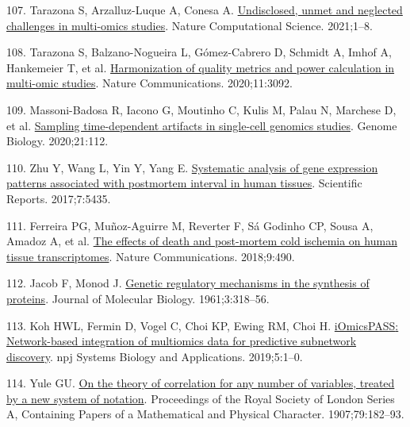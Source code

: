 \documentclass[
  12pt,
  a4paper,
  twoside,
  openright]{book}
\newlength{\cslhangindent}
\newlength{\cslentryspacingunit} %
\newenvironment{CSLReferences}[2] %
 {%
  \setlength{\parindent}{0pt}
  \ifodd #1
  \let\oldpar\par
  \def\par{\hangindent=\cslhangindent\oldpar}
  \fi
  \setlength{\parskip}{#2\cslentryspacingunit}
 }%
 {}
\begin{document}
\begin{CSLReferences}{0}{0}
\leavevmode{}%
107. Tarazona S, Arzalluz-Luque A, Conesa A. \href{https://doi.org/10.1038/s43588-021-00086-z}{Undisclosed, unmet and neglected challenges in multi-omics studies}. Nature Computational Science. 2021;1--8.

\leavevmode{}%
108. Tarazona S, Balzano-Nogueira L, Gómez-Cabrero D, Schmidt A, Imhof A, Hankemeier T, et al. \href{https://doi.org/10.1038/s41467-020-16937-8}{Harmonization of quality metrics and power calculation in multi-omic studies}. Nature Communications. 2020;11:3092.

\leavevmode{}%
109. Massoni-Badosa R, Iacono G, Moutinho C, Kulis M, Palau N, Marchese D, et al. \href{https://doi.org/10.1186/s13059-020-02032-0}{Sampling time-dependent artifacts in single-cell genomics studies}. Genome Biology. 2020;21:112.

\leavevmode{}%
110. Zhu Y, Wang L, Yin Y, Yang E. \href{https://doi.org/10.1038/s41598-017-05882-0}{Systematic analysis of gene expression patterns associated with postmortem interval in human tissues}. Scientific Reports. 2017;7:5435.

\leavevmode{}%
111. Ferreira PG, Muñoz-Aguirre M, Reverter F, Sá Godinho CP, Sousa A, Amadoz A, et al. \href{https://doi.org/10.1038/s41467-017-02772-x}{The effects of death and post-mortem cold ischemia on human tissue transcriptomes}. Nature Communications. 2018;9:490.

\leavevmode{}%
112. Jacob F, Monod J. \href{https://doi.org/10.1016/S0022-2836(61)80072-7}{Genetic regulatory mechanisms in the synthesis of proteins}. Journal of Molecular Biology. 1961;3:318--56.

\leavevmode{}%
113. Koh HWL, Fermin D, Vogel C, Choi KP, Ewing RM, Choi H. \href{https://doi.org/10.1038/s41540-019-0099-y}{{iOmicsPASS}: Network-based integration of multiomics data for predictive subnetwork discovery}. npj Systems Biology and Applications. 2019;5:1--0.

\leavevmode{}%
114. Yule GU. \href{https://www.jstor.org/stable/92723}{On the theory of correlation for any number of variables, treated by a new system of notation}. Proceedings of the Royal Society of London Series A, Containing Papers of a Mathematical and Physical Character. 1907;79:182--93.


\end{CSLReferences}
\end{document}
